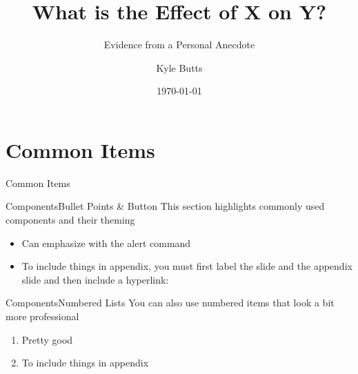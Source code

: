 \documentclass[aspectratio=43]{beamer}
\title{What is the Effect of X on Y?}
\subtitle{Evidence from a Personal Anecdote}
\date{\today}
\author{Kyle Butts}
\begin{document}
\begin{frame}
\maketitle

\end{frame}

\section{Common Items}

\begin{transitionframe}
Common Items
\end{transitionframe}

\begin{frame}{Components}{Bullet Points \& Button}\label{main1}
    This section highlights commonly used components and their theming

    \begin{itemize}
        \item Can emphasize with \alert{the alert command}
        
        \item To include things in appendix, you must first label the slide and the appendix slide and then include a hyperlink:
        
        \vspace{5mm}
        \hyperlink{appendix1}{}
    \end{itemize}
\end{frame}

\begin{frame}{Components}{Numbered Lists}
    You can also use numbered items that look a bit more professional

    \begin{enumerate}
        \item Pretty good
        
        \item To include things in appendix
    \end{enumerate}
\end{frame}
\end{document}
